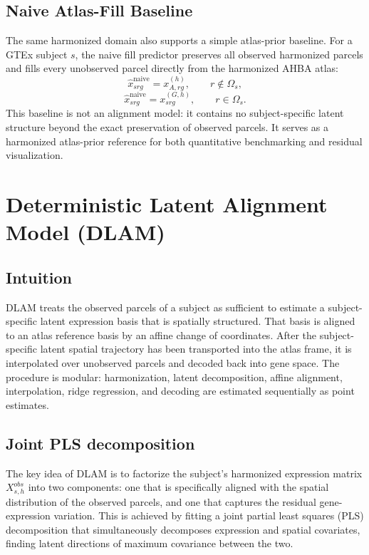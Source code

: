 \documentclass[11pt]{article}
\numberwithin{equation}{section}
\begin{document}
\subsection{Naive Atlas-Fill Baseline}
\label{sec:naive-fill}
The same harmonized domain also supports a simple atlas-prior baseline.  For a GTEx
subject $s$, the naive fill predictor preserves all observed harmonized parcels and
fills every unobserved parcel directly from the harmonized AHBA atlas:
\begin{equation}
  \label{eq:naive-fill-unobs}
  \hat{x}_{srg}^{\text{naive}} = x_{A,rg}^{(h)}, \qquad r \notin \Omega_s,
\end{equation}
\begin{equation}
  \label{eq:naive-fill-obs}
  \hat{x}_{srg}^{\text{naive}} = x_{srg}^{(G,h)}, \qquad r \in \Omega_s.
\end{equation}
This baseline is not an alignment model: it contains no subject-specific latent
structure beyond the exact preservation of observed parcels.  It serves as a
harmonized atlas-prior reference for both quantitative benchmarking and residual
visualization.

\section{Deterministic Latent Alignment Model (DLAM)}
\subsection{Intuition}
DLAM treats the observed parcels of a subject as
sufficient to estimate a subject-specific latent expression basis that is spatially
structured.  That basis is aligned to an atlas reference basis by an affine change of
coordinates.  After the subject-specific latent spatial trajectory has been transported
into the atlas frame, it is interpolated over unobserved parcels and decoded back into
gene space.  The procedure is modular: harmonization, latent decomposition, affine
alignment, interpolation, ridge regression, and decoding are estimated sequentially as
point estimates.

\subsection{Joint PLS decomposition}
\label{sec:det-pls}

The key idea of DLAM is to factorize the subject's harmonized
expression matrix $X_{s,h}^{obs}$ into two components: one that is specifically
aligned with the spatial distribution of the observed parcels, and one that captures
the residual gene-expression variation.  This is achieved by fitting a joint partial
least squares (PLS) decomposition that simultaneously decomposes expression and
spatial covariates, finding latent directions of maximum covariance between the two.
\end{document}
